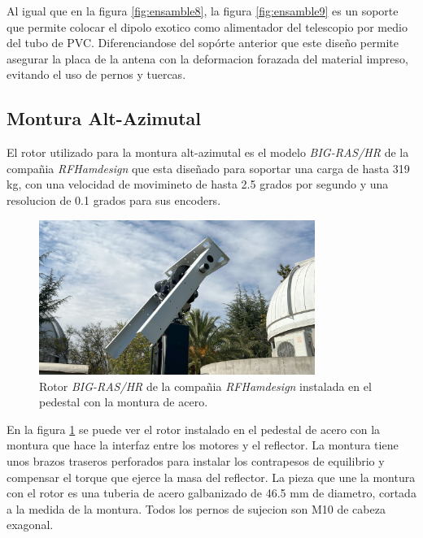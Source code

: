 Al igual que en la figura \ref{fig:ensamble8}, la figura \ref{fig:ensamble9} es un soporte que permite colocar el dipolo exotico como alimentador del telescopio por medio del tubo de PVC. Diferenciandose del sopórte anterior que este diseño permite asegurar la placa de la antena con la deformacion forazada del material impreso, evitando el uso de pernos y tuercas.\\

\subsection{Montura Alt-Azimutal}

El rotor utilizado para la montura alt-azimutal es el modelo \textit{BIG-RAS/HR} de la compañia \textit{RFHamdesign} que esta diseñado para soportar una carga de hasta 319 kg, con una velocidad de movimineto de hasta 2.5 grados por segundo y una resolucion de 0.1 grados para sus encoders.\\

\begin{figure}
    \centering
    \includegraphics[width=0.8\textwidth]{img/soporte_montura}
    \caption{Rotor \textit{BIG-RAS/HR} de la compañia \textit{RFHamdesign} instalada en el pedestal con la montura de acero.}
    \label{fig:ensamble10}
\end{figure}

En la figura \ref{fig:ensamble10} se puede ver el rotor instalado en el pedestal de acero con la montura que hace la interfaz entre los motores y el reflector. La montura tiene unos brazos traseros perforados para instalar los contrapesos de equilibrio y compensar el torque que ejerce la masa del reflector. La pieza que une la montura con el rotor es una tuberia de acero galbanizado de 46.5 mm de diametro, cortada a la medida de la montura. Todos los pernos de sujecion son M10 de cabeza exagonal.\\

